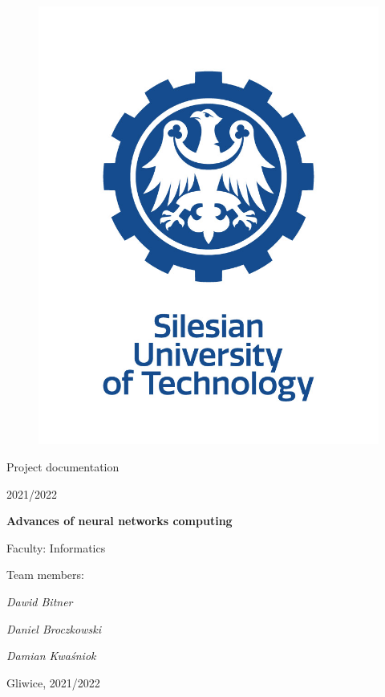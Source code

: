 \documentclass[12pt,a4paper]{article}
\begin{document}
\nocite{*}

\clearpage
\begin{figure}[h]
\centering
\includegraphics[scale=0.4]{media/politechnika_sl_logo_pion_en_rgb.jpg}
\end{figure}
\hspace{3cm}
\begin{center}Project documentation \end{center}
\begin{center}2021/2022\end{center}
\hspace{3cm}
\begin{center}\large\textbf{Advances of neural networks computing}\end{center}
\hspace{7cm}
\begin{flushright}Faculty: Informatics
\end{flushright}
\begin{flushright}Team members:
\par
\textit{Dawid Bitner}
\par
\textit{Daniel Broczkowski}
\par
\textit{Damian Kwaśniok}
\end{flushright}
\vfill
\begin{center}Gliwice, 2021/2022\end{center}
\end{document}
